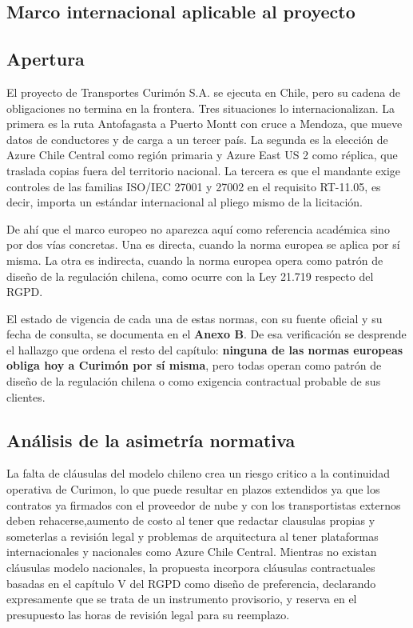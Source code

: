 \subsection{Marco internacional aplicable al proyecto}\label{marco-internacional-aplicable-al-proyecto}

\subsection{Apertura}\label{apertura}

El proyecto de Transportes Curimón S.A. se ejecuta en Chile, pero su cadena de obligaciones no termina en la frontera. Tres situaciones lo internacionalizan. La primera es la ruta Antofagasta a Puerto Montt con cruce a Mendoza, que mueve datos de conductores y de carga a un tercer país. La segunda es la elección de Azure Chile Central como región primaria y Azure East US 2 como réplica, que traslada copias fuera del territorio nacional. La tercera es que el mandante exige controles de las familias ISO/IEC 27001 y 27002 en el requisito RT-11.05, es decir, importa un estándar internacional al pliego mismo de la licitación.

De ahí que el marco europeo no aparezca aquí como referencia académica sino por dos vías concretas. Una es directa, cuando la norma europea se aplica por sí misma. La otra es indirecta, cuando la norma europea opera como patrón de diseño de la regulación chilena, como ocurre con la Ley 21.719 respecto del RGPD.

El estado de vigencia de cada una de estas normas, con su fuente oficial y su fecha de consulta, se documenta en el \textbf{Anexo B}. De esa verificación se desprende el hallazgo que ordena el resto del capítulo: \textbf{ninguna de las normas europeas obliga hoy a Curimón por sí misma}, pero todas operan como patrón de diseño de la regulación chilena o como exigencia contractual probable de sus clientes.

\subsection{Análisis de la asimetría normativa}\label{anuxe1lisis-de-la-asimetruxeda-normativa}

La falta de cláusulas del modelo chileno crea un riesgo critico a la continuidad operativa de Curimon, lo que puede resultar en plazos extendidos ya que los contratos ya firmados con el proveedor de nube y con los transportistas externos deben rehacerse,aumento de costo al tener que redactar clausulas propias y someterlas a revisión legal y problemas de arquitectura al tener plataformas internacionales y nacionales como Azure Chile Central. Mientras no existan cláusulas modelo nacionales, la propuesta incorpora cláusulas contractuales basadas en el capítulo V del RGPD como diseño de preferencia, declarando expresamente que se trata de un instrumento provisorio, y reserva en el presupuesto las horas de revisión legal para su reemplazo.

